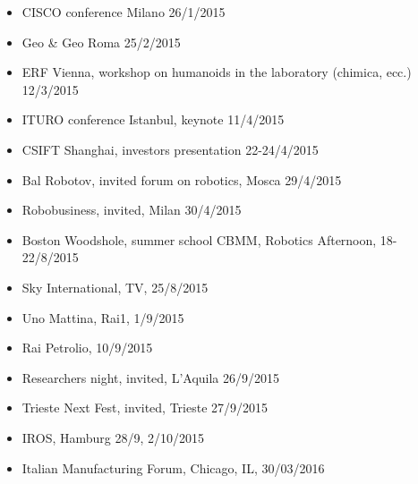 \begin{itemize}
\item CISCO conference Milano 26/1/2015
\item Geo \& Geo Roma 25/2/2015
\item ERF Vienna, workshop on humanoids in the laboratory (chimica, ecc.) 12/3/2015
\item ITURO conference Istanbul, keynote 11/4/2015
\item CSIFT Shanghai, investors presentation 22-24/4/2015
\item Bal Robotov, invited forum on robotics, Mosca 29/4/2015
\item Robobusiness, invited, Milan 30/4/2015
\item Boston Woodshole, summer school CBMM, Robotics Afternoon, 18-22/8/2015
\item Sky International, TV, 25/8/2015
\item Uno Mattina, Rai1, 1/9/2015
\item Rai Petrolio, 10/9/2015
\item Researchers night, invited, L'Aquila 26/9/2015
\item Trieste Next Fest, invited, Trieste 27/9/2015
\item IROS, Hamburg 28/9, 2/10/2015
\item Italian Manufacturing Forum, Chicago, IL, 30/03/2016
\end{itemize}